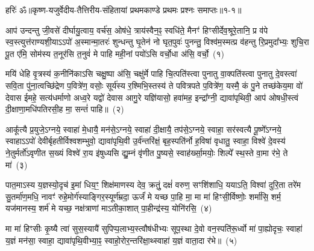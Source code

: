 {\anuvakamend[{जु॒षेथा॒मा स नो॑ यजा॒दा त्रयो॑विꣳशतिश्च}]}

{हरिः॑ ॐ}{॥कृष्ण-यजुर्वेदीय-तैत्तिरीय-संहितायां प्रथमकाण्डे प्रथमः प्रश्नः समाप्तः॥१-१॥}



\setcounter{anuvakam}{0}
आप॑ उन्दन्तु जी॒वसे॑ दीर्घायु॒त्वाय॒ वर्च॑स॒ ओष॑धे॒ त्राय॑स्वैन॒ꣴ॒ स्वधि॑ते॒ मैनꣳ॑ हिꣳसीर्देव॒श्रूरे॒तानि॒ प्र व॑पे स्व॒स्त्युत्त॑राण्यशी॒या\-ऽऽ\-पो॑ अ॒स्मान्मा॒तरः॑ शुन्धन्तु घृ॒तेन॑ नो घृत॒पुवः॑ पुनन्तु॒ विश्व॑म॒स्मत्प्र व॑हन्तु रि॒प्रमुदा᳚भ्यः॒ शुचि॒रा पू॒त ए॑मि॒ सोम॑स्य त॒नूर॑सि त॒नुवं॑ मे पाहि मही॒नां पयो॑\-ऽसि वर्चो॒धा अ॑सि॒ वर्चो॒~(१)\ip

मयि॑ धेहि वृ॒त्रस्य॑ क॒नीनि॑का\-ऽसि चक्षु॒ष्पा अ॑सि॒ चक्षु॑र्मे पाहि चि॒त्पति॑स्त्वा पुनातु वा॒क्पति॑स्त्वा पुनातु दे॒वस्त्वा॑ सवि॒ता पु॑ना॒त्वच्छि॑द्रेण प॒वित्रे॑ण॒ वसोः॒ सूर्य॑स्य र॒श्मिभि॒स्तस्य॑ ते पवित्रपते प॒वित्रे॑ण॒ यस्मै॒ कं पु॒ने तच्छ॑केय॒मा वो॑ देवास ईमहे॒ सत्य॑धर्माणो अध्व॒रे यद्वो॑ देवास आगु॒रे यज्ञि॑यासो॒ हवा॑मह॒ इन्द्रा᳚ग्नी॒ द्यावा॑पृथिवी॒ आप॑ ओषधी॒स्त्वं दी॒क्षाणा॒मधि॑\-पतिरसी॒ह मा॒ सन्तं॑ पाहि॥~(२)\ip

{\anuvakamend[{वर्च॑ ओषधीर॒ष्टौ च॑}]}

आकू᳚त्यै प्र॒युजे॒\-ऽग्नये॒ स्वाहा॑ मे॒धायै॒ मन॑से॒\-ऽग्नये॒ स्वाहा॑ दी॒क्षायै॒ तप॑से॒\-ऽग्नये॒ स्वाहा॒ सर॑स्वत्यै पू॒ष्णे᳚\-ऽग्नये॒ स्वाहा\-ऽऽ\-पो॑ देवीर्बृहतीर्विश्वशम्भुवो॒ द्यावा॑\-पृथि॒वी उ॒र्व॑न्तरि॑क्षं॒ बृह॒स्पति॑र्नो ह॒विषा॑ वृधातु॒ स्वाहा॒ विश्वे॑ दे॒वस्य॑ ने॒तुर्मर्तो॑\-ऽवृणीत स॒ख्यं विश्वे॑ रा॒य इ॑षुध्यसि द्यु॒म्नं वृ॑णीत पु॒ष्यसे॒ स्वाह॑र्ख्सा॒मयोः॒ शिल्पे᳚ स्थ॒स्ते वा॒मा र॑भे॒ ते मा॑~(३)\ip

पात॒मा\-ऽस्य य॒ज्ञस्यो॒दृच॑ इ॒मां धिय॒ꣳ॒ शिक्ष॑माणस्य देव॒ क्रतुं॒ दक्षं॑ वरुण॒ सꣳशि॑शाधि॒ यया\-ऽति॒ विश्वा॑ दुरि॒ता तरे॑म सु॒तर्मा॑ण॒मधि॒ नावꣳ॑ रुहे॒मोर्ग॑स्याङ्गिर॒स्यूर्ण॑म्रदा॒ ऊर्जं॑ मे यच्छ पा॒हि मा॒ मा मा॑ हिꣳसी॒र्विष्णोः॒ शर्मा॑सि॒ शर्म॒ यज॑मानस्य॒ शर्म॑ मे यच्छ॒ नक्ष॑त्राणां मा\-ऽतीका॒शात् पा॒हीन्द्र॑स्य॒ योनि॑रसि॒~(४)\ip

मा मा॑ हिꣳसीः कृ॒ष्यै त्वा॑ सुस॒स्यायै॑ सुपिप्प॒लाभ्य॒स्त्वौष॑\-धीभ्यः सूप॒स्था दे॒वो वन॒स्पति॑रू॒र्ध्वो मा॑ पा॒ह्योदृचः॒ स्वाहा॑ य॒ज्ञं मन॑सा॒ स्वाहा॒ द्यावा॑\-पृथि॒वीभ्या॒ꣴ॒ स्वाहो॒रोर॒न्तरि॑क्षा॒थ्\-स्वाहा॑ य॒ज्ञं वाता॒दा र॑भे॥~(५)\ip


